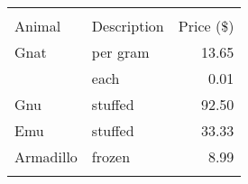 \documentclass{article}
\begin{document}
            \begin{tabular}{ | l | l | r | }
                \hline\noalign{\smallskip}
                \multicolumn{2}{c}{Item} \\
                \cline{1-2}\noalign{\smallskip}
                 Animal & Description & Price (\$) \\
                \noalign{\smallskip}\hline\noalign{\smallskip}
                       Gnat  & per gram & 13.65 \\
                             & each     &  0.01 \\
                       Gnu   & stuffed  & 92.50 \\
                       Emu   & stuffed  & 33.33 \\
                       Armadillo & frozen & 8.99 \\
                \noalign{\smallskip}\hline
           \end{tabular}

   
\end{document}
